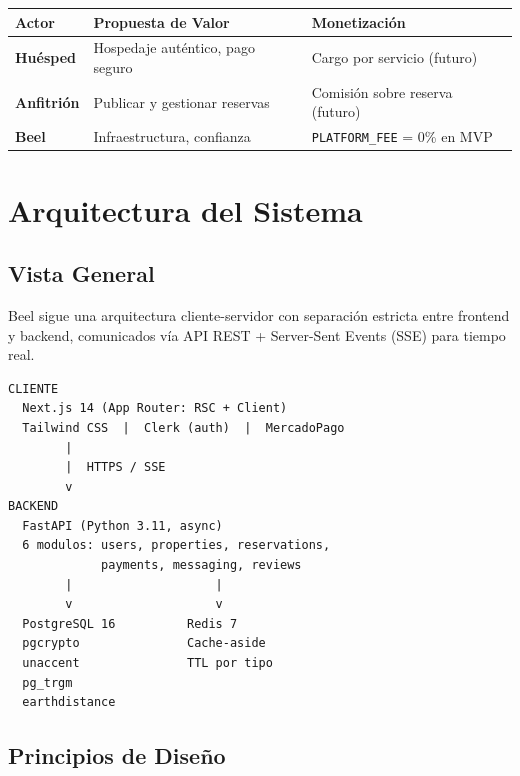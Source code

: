 \documentclass[12pt,a4paper]{report}
\begin{document}
\begin{center}
\begin{tabularx}{\textwidth}{L{3cm} X X}
\toprule
\textbf{Actor} & \textbf{Propuesta de Valor} & \textbf{Monetizaci\'on} \\
\midrule
\textbf{Hu\'esped} & Hospedaje aut\'entico, pago seguro & Cargo por servicio (futuro) \\
\textbf{Anfitri\'on} & Publicar y gestionar reservas & Comisi\'on sobre reserva (futuro) \\
\textbf{Beel} & Infraestructura, confianza & \texttt{PLATFORM\_FEE} = 0\% en MVP \\
\bottomrule
\end{tabularx}
\end{center}

\chapter{Arquitectura del Sistema}

\section{Vista General}

Beel sigue una arquitectura cliente-servidor con separaci\'on estricta entre frontend y
backend, comunicados v\'ia API REST + Server-Sent Events (SSE) para tiempo real.

\begin{tcolorbox}[beelinfo, title={Capas de la Arquitectura}]
\begin{lstlisting}[numbers=none, frame=none, xleftmargin=0pt]
CLIENTE
  Next.js 14 (App Router: RSC + Client)
  Tailwind CSS  |  Clerk (auth)  |  MercadoPago
        |
        |  HTTPS / SSE
        v
BACKEND
  FastAPI (Python 3.11, async)
  6 modulos: users, properties, reservations,
             payments, messaging, reviews
        |                    |
        v                    v
  PostgreSQL 16          Redis 7
  pgcrypto               Cache-aside
  unaccent               TTL por tipo
  pg_trgm
  earthdistance
\end{lstlisting}
\end{tcolorbox}

\section{Principios de Dise\~no}
\end{document}
